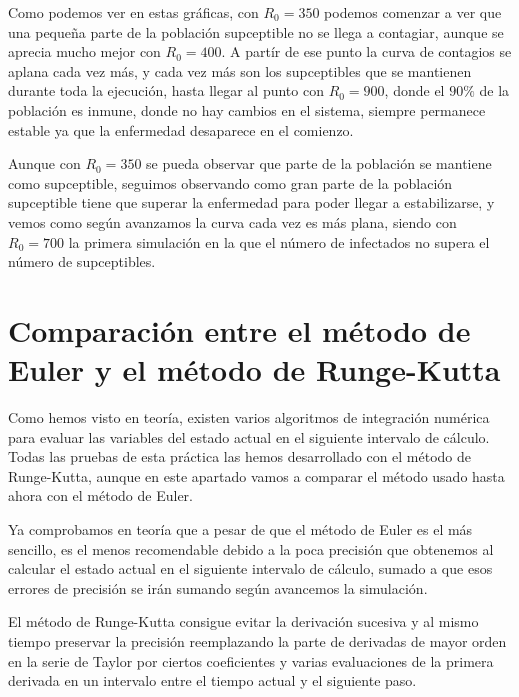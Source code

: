 \documentclass[12pt, spanish]{article}
\begin{document}

Como podemos ver en estas gráficas, con $R_0 = 350$ podemos comenzar a ver que una pequeña parte de la población supceptible no se llega a contagiar, aunque se aprecia mucho mejor con $R_0 = 400$. A partír de ese punto la curva de contagios se aplana cada vez más, y cada vez más son los supceptibles que se mantienen durante toda la ejecución, hasta llegar al punto con $R_0 = 900$, donde el $90\%$ de la población es inmune, donde no hay cambios en el sistema, siempre permanece estable ya que la enfermedad desaparece en el comienzo.

Aunque con $R_0 = 350$ se pueda observar que parte de la población se mantiene como supceptible, seguimos observando como gran parte de la población supceptible tiene que superar la enfermedad para poder llegar a estabilizarse, y vemos como según avanzamos la curva cada vez es más plana, siendo con $R_0 = 700$ la primera simulación en la que el número de infectados no supera el número de supceptibles.


\section{Comparación entre el método de Euler y el método de Runge-Kutta}

Como hemos visto en teoría, existen varios algoritmos de integración numérica para evaluar las variables del estado actual en el siguiente intervalo de cálculo. Todas las pruebas de esta práctica las hemos desarrollado con el método de Runge-Kutta, aunque en este apartado vamos a comparar el método usado hasta ahora con el método de Euler.

Ya comprobamos en teoría que a pesar de que el método de Euler es el más sencillo, es el menos recomendable debido a la poca precisión que obtenemos al calcular el estado actual en el siguiente intervalo de cálculo, sumado a que esos errores de precisión se irán sumando según avancemos la simulación.

El método de Runge-Kutta consigue evitar la derivación sucesiva y al mismo tiempo preservar la precisión reemplazando la parte de derivadas de mayor orden en la serie de Taylor por ciertos coeficientes y varias evaluaciones de la primera derivada en un intervalo entre el tiempo actual y el siguiente paso.
\end{document}

